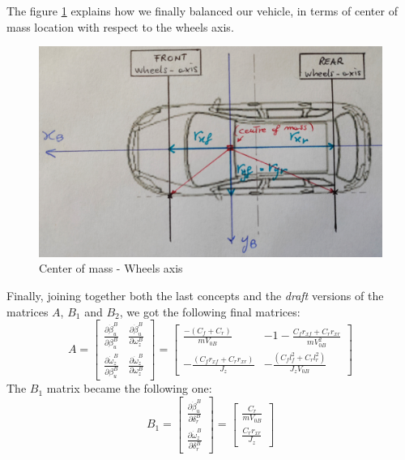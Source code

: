 	The figure \ref{VehicleScheme} explains how we finally balanced our vehicle, in terms of center of mass location with respect to the wheels axis.
	\begin{figure}
		\centering
		\includegraphics[scale=0.1]{../Images/LinSyst/SchemaAssi}
		\caption{Center of mass - Wheels axis}
		\label{VehicleScheme}
	\end{figure}
\newpage
	Finally, joining together both the last concepts and the \textit{draft} versions of the matrices $A$, $B_{1}$ and $B_{2}$, we got the following final matrices:
\begin{equation}
	A=
	\begin{bmatrix}
		\frac{\partial\dot{\beta}_{u}^{B}}{\partial\beta_{u}^{B}} & \frac{\partial\dot{\beta}_{u}^{B}}{\partial\omega_{z}^{B}} \\
		\frac{\partial\dot{\omega}_{z}^{B}}{\partial\beta_{u}^{B}} & \frac{\partial\dot{\omega}_{z}^{B}}{\partial\omega_{z}^{B}}
	\end{bmatrix} =
	\begin{bmatrix}
		\frac{-(C_{f} + C_{r})}{mV_{0B}} & -1 -\frac{C_{f}r_{xf} + C_{r}r_{xr}}{m V_{0B}^{2}} \\
		-\frac{(C_{f}r_{xf} + C_{r}r_{xr})}{J_{z}} & -\frac{(C_{f}l_{f}^{2} + C_{r}l_{r}^{2})}{J_{z} V_{0B}}
	\end{bmatrix}
\end{equation}
The $B_{1}$ matrix became the following one:
\begin{equation}
B_{1}=
\begin{bmatrix}
\frac{\partial\dot{\beta}_{u}^{B}}{\partial\delta_{r}^{B}} \\
\frac{\partial\dot{\omega}_{z}^{B}}{\partial\delta_{r}^{B}}
\end{bmatrix} =
\begin{bmatrix}
\frac{C_{r}}{m V_{0B}} \\ \frac{C_{r}r_{xr}}{J_{z}}
\end{bmatrix}
\end{equation}
